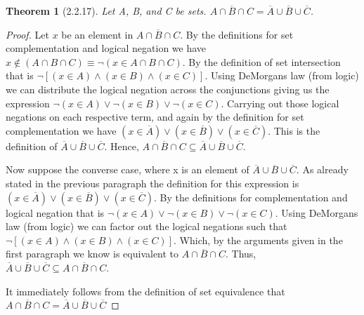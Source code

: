 \documentclass[a4paper, 12pt]{article}
\theoremstyle{plain}
\newtheorem*{theorem*}{Theorem}
\begin{document}
	
	\begin{theorem*}[2.2.17]
		Let A, B, and C be sets. $\overline{A \cap B \cap C} = \overline{A} \cup \overline{B} \cup \overline {C}$.
	\end{theorem*}
	
	\begin{proof}
		Let $x$ be an element in $\overline{A \cap B \cap C}$. By the definitions for set \newline complementation and logical negation we have \newline $x \notin (A \cap B \cap C) \equiv \lnot (x \in A \cap B \cap C)$. By the definition of set intersection that is $\lnot [(x \in A) \land (x \in B) \land (x \in C)]$. Using DeMorgans law (from logic) we can distribute the logical negation across the conjunctions giving us the expression $\lnot (x \in A) \lor \lnot (x \in B) \lor \lnot (x \in C)$. Carrying out those logical negations on each respective term, and again by the definition for set complementation we have $(x \in \overline{A}) \lor (x \in \overline{B}) \lor (x \in \overline{C})$. This is the definition of $\overline{A} \cup \overline{B} \cup \overline{C}$. Hence, $\overline{A \cap B \cap C} \subseteq \overline{A} \cup \overline{B} \cup \overline{C}$.
		
		Now suppose the converse case, where x is an element of $\overline{A} \cup \overline{B} \cup \overline{C}$. As already stated in the previous paragraph the definition for this expression is $(x \in \overline{A}) \lor (x \in \overline{B}) \lor (x \in \overline{C})$. By the definitions for complementation and logical negation that is $\lnot (x \in A) \lor \lnot (x \in B) \lor \lnot (x \in C)$. Using DeMorgans law (from logic) we can factor out the logical negations such that $\lnot [(x \in A) \land (x \in B) \land (x \in C)]$. Which, by the arguments given in the first paragraph we know is equivalent to $\overline{A \cap B \cap C}$. Thus, $\overline{A} \cup \overline{B} \cup \overline{C} \subseteq \overline{A \cap B \cap C}$.
		
		It immediately follows from the definition of set equivalence that \newline $\overline{A \cap B \cap C} = \overline{A} \cup \overline{B} \cup \overline{C}$
	\end{proof}
\end{document}
